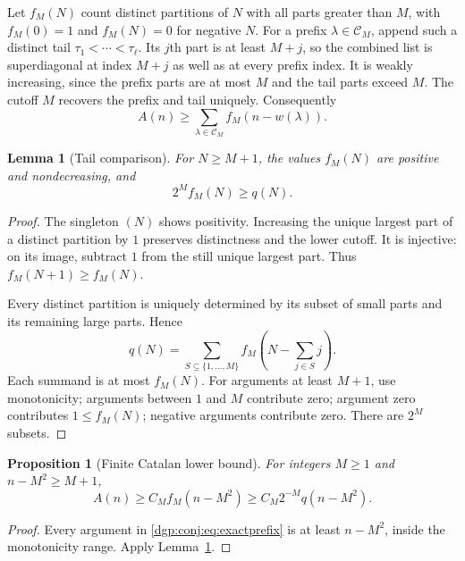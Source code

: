 \documentclass[11pt,letterpaper]{article}
\numberwithin{equation}{section}
\newtheorem{lemma}[theorem]{Lemma}
\newtheorem{proposition}[theorem]{Proposition}
\theoremstyle{remark}\newtheorem{remark}[theorem]{Remark}
\begin{document}
Let $f_M(N)$ count distinct partitions of $N$ with all parts greater
than $M$, with $f_M(0)=1$ and $f_M(N)=0$ for negative $N$.
For a prefix $\lambda\in\mathcal C_M$, append such a distinct tail
$\tau_1<\cdots<\tau_\ell$. Its $j$th part is at least $M+j$,
so the combined list is superdiagonal at index $M+j$ as well as at
every prefix index. It is weakly increasing, since the prefix parts
are at most $M$ and the tail parts exceed $M$. The cutoff $M$
recovers the prefix and tail uniquely. Consequently
\begin{equation}\label{dgp:conj:eq:exactprefix}
 A(n)\geq\sum_{\lambda\in\mathcal C_M}f_M(n-w(\lambda)).
\end{equation}

\begin{lemma}[Tail comparison]\label{dgp:conj:lem:tail}
For $N\geq M+1$, the values $f_M(N)$ are positive and nondecreasing,
and
\begin{equation}\label{dgp:conj:eq:tailcompare}
 2^M f_M(N)\geq q(N).
\end{equation}
\end{lemma}
\begin{proof}
The singleton $(N)$ shows positivity. Increasing the unique largest
part of a distinct partition by $1$ preserves distinctness and the
lower cutoff. It is injective: on its image, subtract $1$ from the
still unique largest part. Thus $f_M(N+1)\geq f_M(N)$.

Every distinct partition is uniquely determined by its subset of
small parts and its remaining large parts. Hence
\begin{equation}\label{dgp:conj:eq:subsetdecomp}
 q(N)=\sum_{S\subseteq\{1,\ldots,M\}}
 f_M\left(N-\sum_{j\in S}j\right).
\end{equation}
Each summand is at most $f_M(N)$. For arguments at least $M+1$,
use monotonicity; arguments between $1$ and $M$ contribute zero;
argument zero contributes $1\leq f_M(N)$; negative arguments
contribute zero. There are $2^M$ subsets.
\end{proof}

\begin{proposition}[Finite Catalan lower bound]\label{dgp:conj:prop:finite}
For integers $M\geq1$ and $n-M^2\geq M+1$,
\begin{equation}\label{dgp:conj:eq:finitebase}
 A(n)\geq C_M f_M(n-M^2)\geq C_M2^{-M}q(n-M^2).
\end{equation}
\end{proposition}
\begin{proof}
Every argument in \eqref{dgp:conj:eq:exactprefix} is at least $n-M^2$,
inside the monotonicity range. Apply Lemma~\ref{dgp:conj:lem:tail}.
\end{proof}
\end{document}
